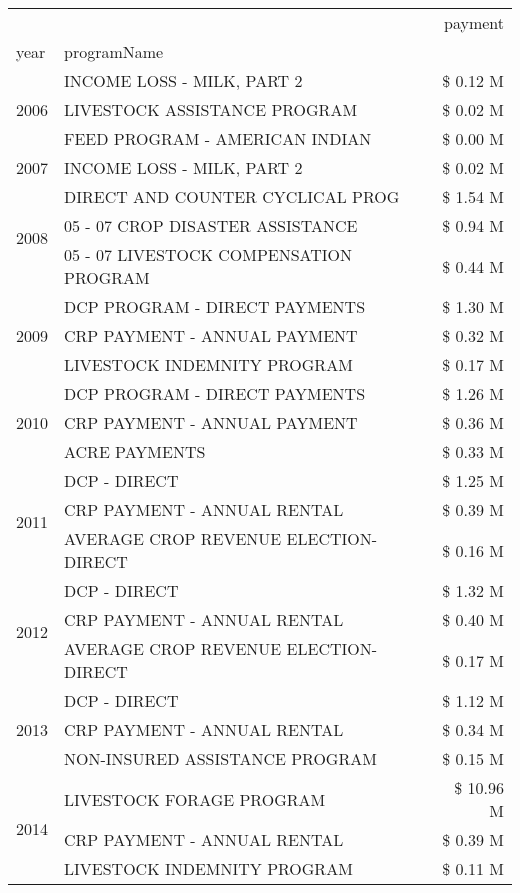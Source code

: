 \begin{tabular}{llr}
\toprule
 &  & payment \\
year & programName &  \\
\midrule
\multirow[t]{3}{*}{2006} & INCOME LOSS - MILK, PART 2 & \$ 0.12 M \\
 & LIVESTOCK ASSISTANCE PROGRAM & \$ 0.02 M \\
 & FEED PROGRAM - AMERICAN INDIAN & \$ 0.00 M \\
\cline{1-3}
2007 & INCOME LOSS - MILK, PART 2 & \$ 0.02 M \\
\cline{1-3}
\multirow[t]{3}{*}{2008} & DIRECT AND COUNTER CYCLICAL PROG & \$ 1.54 M \\
 & 05 - 07 CROP DISASTER ASSISTANCE & \$ 0.94 M \\
 & 05 - 07 LIVESTOCK COMPENSATION PROGRAM & \$ 0.44 M \\
\cline{1-3}
\multirow[t]{3}{*}{2009} & DCP PROGRAM - DIRECT PAYMENTS & \$ 1.30 M \\
 & CRP PAYMENT - ANNUAL PAYMENT & \$ 0.32 M \\
 & LIVESTOCK INDEMNITY PROGRAM & \$ 0.17 M \\
\cline{1-3}
\multirow[t]{3}{*}{2010} & DCP PROGRAM - DIRECT PAYMENTS & \$ 1.26 M \\
 & CRP PAYMENT - ANNUAL PAYMENT & \$ 0.36 M \\
 & ACRE PAYMENTS & \$ 0.33 M \\
\cline{1-3}
\multirow[t]{3}{*}{2011} & DCP - DIRECT & \$ 1.25 M \\
 & CRP PAYMENT - ANNUAL RENTAL & \$ 0.39 M \\
 & AVERAGE CROP REVENUE ELECTION-DIRECT & \$ 0.16 M \\
\cline{1-3}
\multirow[t]{3}{*}{2012} & DCP - DIRECT & \$ 1.32 M \\
 & CRP PAYMENT - ANNUAL RENTAL & \$ 0.40 M \\
 & AVERAGE CROP REVENUE ELECTION-DIRECT & \$ 0.17 M \\
\cline{1-3}
\multirow[t]{3}{*}{2013} & DCP - DIRECT & \$ 1.12 M \\
 & CRP PAYMENT - ANNUAL RENTAL & \$ 0.34 M \\
 & NON-INSURED ASSISTANCE PROGRAM & \$ 0.15 M \\
\cline{1-3}
\multirow[t]{3}{*}{2014} & LIVESTOCK FORAGE PROGRAM & \$ 10.96 M \\
 & CRP PAYMENT - ANNUAL RENTAL & \$ 0.39 M \\
 & LIVESTOCK INDEMNITY PROGRAM & \$ 0.11 M \\

\end{tabular}
